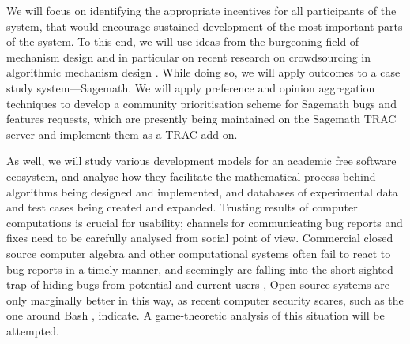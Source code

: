 \begin{workpackage}[id=social-aspects,wphases=1-48!.5,
  title=Social Aspects,
  lead=UO,
  UORM=1,USHRM=8, USORM=5]
\begin{wpdescription}
We will focus on identifying the appropriate incentives for all
participants of the system, that would encourage sustained development of the
most important parts of the system.  To this end, we will use ideas from the
burgeoning field of mechanism design \cite{AGTbook} and in
particular on recent research on crowdsourcing in algorithmic mechanism design
\cite{crowds}.  While doing so, we will apply outcomes to a case study
system---Sagemath.
We will apply preference and opinion aggregation techniques \cite{pref-aggr} to  develop
a community prioritisation scheme for Sagemath bugs and features requests, which 
are presently being maintained on the Sagemath TRAC server \cite{trac-sagemath}  and implement
them as a TRAC \cite{Trac} add-on.

As well, we will study various development models for an academic free software ecosystem,
and analyse how they facilitate the mathematical process behind algorithms being
designed and implemented,  and databases of experimental data and test cases being
created and expanded.
Trusting results of computer
computations is crucial for usability; channels for communicating bug reports
and fixes need to be carefully analysed from social point of view. 
Commercial closed source computer algebra and other computational systems often
fail to react to bug reports in a timely manner, and seemingly are falling into the
short-sighted trap of hiding bugs from potential and current users \cite{misfort},
Open source  systems are only marginally better in this way, as recent
computer security scares, such as the one around Bash \cite{shellshock}, indicate.
A game-theoretic analysis of this situation will be attempted.
\end{wpdescription}


\end{workpackage}

